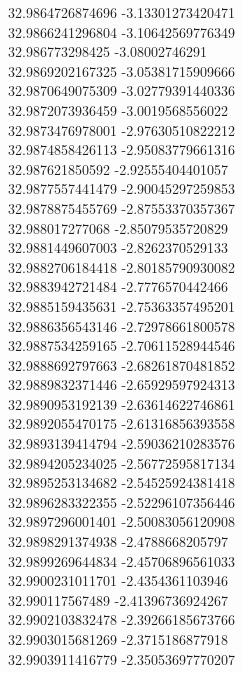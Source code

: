 {32.9864726874696	-3.13301273420471\\
32.9866241296804	-3.10642569776349\\
32.986773298425	-3.08002746291\\
32.9869202167325	-3.05381715909666\\
32.9870649075309	-3.02779391440336\\
32.9872073936459	-3.0019568556022\\
32.9873476978001	-2.97630510822212\\
32.9874858426113	-2.95083779661316\\
32.987621850592	-2.92555404401057\\
32.9877557441479	-2.90045297259853\\
32.9878875455769	-2.87553370357367\\
32.988017277068	-2.85079535720829\\
32.9881449607003	-2.8262370529133\\
32.9882706184418	-2.80185790930082\\
32.9883942721484	-2.7776570442466\\
32.9885159435631	-2.75363357495201\\
32.9886356543146	-2.72978661800578\\
32.9887534259165	-2.70611528944546\\
32.9888692797663	-2.68261870481852\\
32.9889832371446	-2.65929597924313\\
32.9890953192139	-2.63614622746861\\
32.9892055470175	-2.61316856393558\\
32.9893139414794	-2.59036210283576\\
32.9894205234025	-2.56772595817134\\
32.9895253134682	-2.54525924381418\\
32.9896283322355	-2.52296107356446\\
32.9897296001401	-2.50083056120908\\
32.9898291374938	-2.4788668205797\\
32.9899269644834	-2.45706896561033\\
32.9900231011701	-2.4354361103946\\
32.990117567489	-2.41396736924267\\
32.9902103832478	-2.39266185673766\\
32.9903015681269	-2.3715186877918\\
32.9903911416779	-2.35053697770207\\
}

